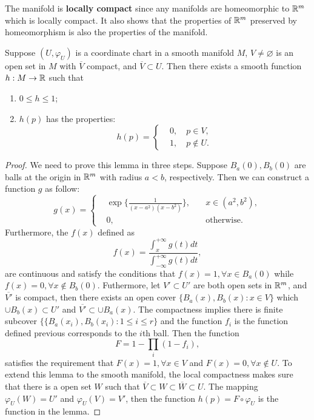 The manifold is \textbf{locally compact} since any manifolds are homeomorphic to $\mathbb{R}^m$ which is locally compact. It also shows that the properties of $\mathbb{R}^m$ preserved by homeomorphism is also the properties of the manifold. 

\begin{lemma}
Suppose $(U,\varphi_U)$ is a coordinate chart in a smooth manifold $M$, $V\ne\varnothing$ is an open set in $M$ with $\overline{V}$ compact, and $\overline{V}\subset U$. Then there exists a smooth function $h:M\to\mathbb{R}$ such that
\begin{enumerate}
\item $0\le h\le 1$;
\item $h(p)$ has the properties:
\begin{equation}
h(p)=\left\{
\begin{aligned}
&0,\quad p\in V,\\
&1,\quad p\notin U.
\end{aligned}
\right.
\end{equation}
\end{enumerate}
\end{lemma}

\begin{proof}
We need to prove this lemma in three steps.
Suppose $B_a(0),B_b(0)$ are balls at the origin in $\mathbb{R}^m$ with radius $a<b$, respectively. Then we can construct a function $g$ as follow:
\begin{equation}
g(x)=\left\{
\begin{aligned}
&\exp\Bigg\{\frac{1}{(x-a^2)(x-b^2)}\Bigg\},&\quad x\in (a^2,b^2),\\
&0 ,&\quad \text{otherwise}.
\end{aligned}
\right.
\end{equation}
Furthermore, the $f(x)$ defined as
\begin{equation}
f(x)=\frac{\int_x^{+\infty} g(t)dt}{\int_{-\infty}^{+\infty}g(t)dt},
\end{equation}
are continuous and satisfy the conditions that $f(x)=1,\forall x\in B_a(0)$ while $f(x)=0,\forall x\notin B_b(0)$.
Futhermore, let $V'\subset U'$ are both open sets in $\mathbb{R}^m$, and $\overline{V'}$ is compact, then there exists an open cover $\{B_a(x),B_b(x):x\in V\}$ which $\cup B_b(x)\subset U'$ and $\overline{V'}\subset \cup B_a(x)$. The compactness implies there is finite subcover $\{\{B_a(x_i),B_b(x_i):1\le i\le r\}$ and the function $f_i$ is the function defined previous corresponds to the $i$th ball. Then the function
\begin{equation}
F=1-\prod_i(1-f_i),
\end{equation}
satisfies the requirement that $F(x)=1,\forall x\in V$ and $F(x)=0,\forall x\notin U$. To extend this lemma to the smooth manifold, the local compactness makes sure that there is a open set $W$ such that $\overline{V}\subset W\subset\overline{W}\subset U$. The mapping $\varphi_U(W)=U'$ and $\varphi_U(V)=V'$, then the function $h(p)=F\circ\varphi_U$ is the function in the lemma.
\end{proof}


